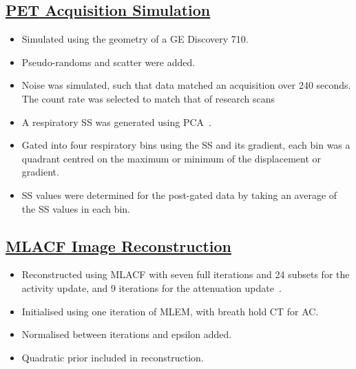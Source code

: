 \documentclass[portrait, color=UCLburgundy, margin=1cm]{uclposter}
\begin{document}
\begin{multicols}{3}
            \subsection*{\underline{\textbf{\acrshort{PET} Acquisition Simulation}}}
                \begin{itemize}
                    \item Simulated using the geometry of a \gls{GE} Discovery 710.
                    \item Pseudo-randoms and scatter were added.
                    \item Noise was simulated, such that data matched an acquisition over 240 seconds. The count rate was selected to match that of research scans
                    \item A respiratory \gls{SS} was generated using \gls{PCA}~\cite{Thielemans2011}.
                    \item Gated into four respiratory bins using the \gls{SS} and its gradient, each bin was a quadrant centred on the maximum or minimum of the displacement or gradient.
                    \item \gls{SS} values were determined for the post-gated data by taking an average of the \gls{SS} values in each bin.
                \end{itemize}
            
            \subsection*{\underline{\textbf{\acrshort{MLACF} Image Reconstruction}}}
                \begin{itemize}
                    \item Reconstructed using \acrshort{MLACF} with seven full iterations and 24 subsets for the activity update, and 9 iterations for the attenuation update~\cite{Nuyts2012ML-reconstructionFactors}.
                    \item Initialised using one iteration of \acrshort{MLEM}, with breath hold \acrshort{CT} for \gls{AC}.
                    \item Normalised between iterations and epsilon added.
                    \item Quadratic prior included in reconstruction.
                \end{itemize}
            

\end{multicols}
\end{document}
